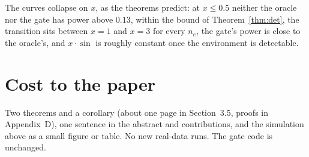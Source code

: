 \documentclass[11pt]{article}
\begin{document}
The curves collapse on $x$, as the theorems predict: at $x\le0.5$ neither the oracle nor the gate has power above $0.13$, within the bound of Theorem~\ref{thm:det}, the transition sits between $x=1$ and $x=3$ for every $n_e$, the gate's power is close to the oracle's, and $x\cdot\sin$ is roughly constant once the environment is detectable.

\section{Cost to the paper}

Two theorems and a corollary (about one page in Section~3.5, proofs in Appendix~D), one sentence in the abstract and contributions, and the simulation above as a small figure or table. No new real-data runs. The gate code is unchanged.



\end{document}
